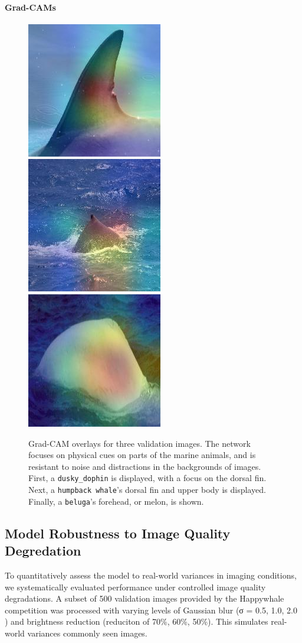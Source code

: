\documentclass[twocolumn]{article}
\begin{document}
\paragraph{Grad-CAMs}
\begin{figure}[H]
  \includegraphics[width=0.32\linewidth]{gradcam_dusky_dolphin.jpg}
  \includegraphics[width=0.32\linewidth]{gradcam_humpback_whale.jpg}
  \includegraphics[width=0.32\linewidth]{gradcam_beluga.jpg}
  \caption{Grad-CAM overlays for three validation
  images.  The network focuses on physical cues on parts of the marine animals, and is resistant to noise and distractions in the backgrounds of images. First, a \texttt{dusky_dophin} is displayed, with a focus on the dorsal fin. Next, a \texttt{humpback whale}'s dorsal fin and upper body is displayed. Finally, a \texttt{beluga}'s forehead, or melon, is shown.}
  \label{fig:gradcam_examples}
\end{figure}

\subsection{Model Robustness to Image Quality Degredation}

To quantitatively assess the model to real-world variances in imaging conditions, we systematically evaluated performance under controlled image quality degradations. A subset of 500 validation images provided by the Happywhale competition was processed with varying levels of Gaussian blur (σ = 0.5, 1.0, 2.0 ) and brightness reduction (reduciton of 70\%, 60\%, 50\%). This simulates real-world variances commonly seen images.
\end{document}
